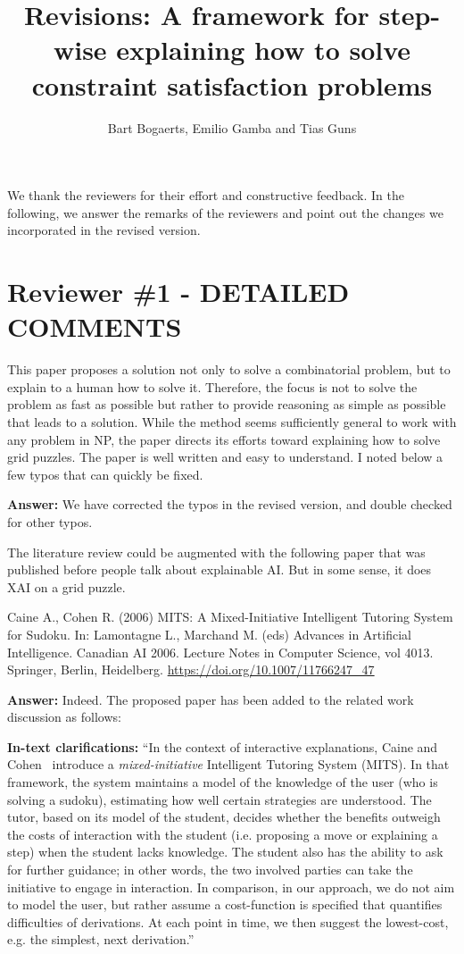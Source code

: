 \documentclass{article}
\title{Revisions: A framework for step-wise explaining how to solve constraint satisfaction problems}
\author{Bart Bogaerts, Emilio Gamba and Tias Guns}
\date{}
\newcommand\comment[1]{\marginpar{\tiny #1}}
\renewcommand\comment[1]{#1}
\newcommand{\tias}[1]{{\comment{\color{blue}\textsc{TG:}#1}}}
\newcommand{\answer}[1]{{\comment{\textbf{Answer:} #1}}}
\newcommand{\clarification}[1]{{\comment{\textbf{In-text clarifications:} #1}}}
\begin{document}
	\maketitle
We thank the reviewers for their effort and constructive feedback. In the following, we answer the remarks of the reviewers and point out the changes we incorporated in the revised version.

\section*{Reviewer \#1 - DETAILED COMMENTS}

\begin{quoteit}
	This paper proposes a solution not only to solve a combinatorial
	problem, but to explain to a human how to solve it. Therefore, the
	focus is not to solve the problem as fast as possible but rather to
	provide reasoning as simple as possible that leads to a solution. While
	the method seems sufficiently general to work with any problem in NP,
	the paper directs its efforts toward explaining how to solve grid
	puzzles.
The paper is well written and easy to understand. I noted below a few typos that can quickly be fixed.
\end{quoteit}

\answer{We have corrected the typos in the revised version, and double checked for other typos.}

\begin{quoteit}
The literature review could be augmented with the following paper that was published before people talk about explainable AI. But in some sense, it does XAI on a grid puzzle.

Caine A., Cohen R. (2006) MITS: A Mixed-Initiative Intelligent Tutoring System for Sudoku. In: Lamontagne L., Marchand M. (eds) Advances in Artificial Intelligence. Canadian AI 2006. Lecture Notes in Computer Science, vol 4013. Springer, Berlin, Heidelberg. \url{https://doi.org/10.1007/11766247_47}
\end{quoteit}

\answer{Indeed. The proposed paper has been added to the related work discussion as follows:}

\clarification{``In the context of interactive explanations, Caine and Cohen~\cite{caine2006mits} introduce a \emph{mixed-initiative} Intelligent Tutoring System (MITS). 
	In that framework, the system maintains a model of the knowledge of the user (who is solving a sudoku), estimating how well certain strategies are understood. 
	The tutor, based on its model of the student, decides whether the benefits outweigh the costs of interaction with the student (i.e. proposing a move or explaining a step) when the student lacks knowledge. The student also has the ability to ask for further guidance; in other words, the two involved parties can take the initiative to engage in interaction. In comparison, in our approach, we do not aim to model the user, but rather assume a cost-function is specified that quantifies difficulties of derivations. At each point in time, we then suggest the lowest-cost, e.g. the simplest, next derivation.''} 
\end{document}
